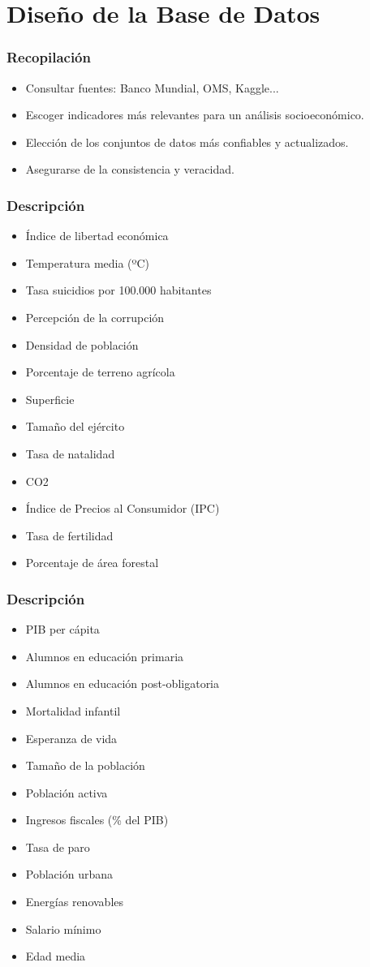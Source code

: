 \documentclass{beamer}
\newcommand{\slideauthor}[1]{\def\insertslideauthor{#1}}
\newcommand{\insertslideauthor}{}
\begin{document}
\section{Diseño de la Base de Datos}
\begin{frame}
\frametitle{Recopilación}
\slideauthor{Javier Comyn}
\begin{itemize}
    \item Consultar fuentes: Banco Mundial, OMS, Kaggle...
    \item Escoger indicadores más relevantes para un análisis socioeconómico.
    \item Elección de los conjuntos de datos más confiables y actualizados.
    \item Asegurarse de la consistencia y veracidad.
\end{itemize}
\end{frame}
\begin{frame}
\frametitle{Descripción}
\slideauthor{Javier Comyn}
\begin{itemize}
    \item Índice de libertad económica
    \item Temperatura media (ºC)
    \item Tasa suicidios por 100.000 habitantes
    \item Percepción de la corrupción
    \item Densidad de población
    \item Porcentaje de terreno agrícola
    \item Superficie
    \item Tamaño del ejército
    \item Tasa de natalidad
    \item CO2
    \item Índice de Precios al Consumidor (IPC)
    \item Tasa de fertilidad
    \item Porcentaje de área forestal
\end{itemize}
\end{frame}
\begin{frame}
\frametitle{Descripción}
\slideauthor{Javier Comyn}
\begin{itemize}
    \item PIB per cápita
    \item Alumnos en educación primaria
    \item Alumnos en educación post-obligatoria
    \item Mortalidad infantil
    \item Esperanza de vida
    \item Tamaño de la población
    \item Población activa
    \item Ingresos fiscales (\% del PIB)
    \item Tasa de paro
    \item Población urbana
    \item Energías renovables
    \item Salario mínimo
    \item Edad media
\end{itemize}
\end{frame}
\end{document}
